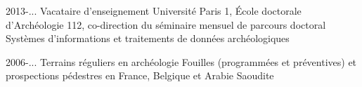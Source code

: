 \begin{cvskills}
  \cvskill
    {2013-...} %
    {Vacataire d'enseignement} %
    {Université Paris 1, École doctorale d'Archéologie 112, co-direction du séminaire mensuel de parcours doctoral Systèmes d'informations et traitements de données archéologiques} %

  \cvskill
    {2006-...} %
    {Terrains réguliers en archéologie} %
    {Fouilles (programmées et préventives) et prospections pédestres en France, Belgique et Arabie Saoudite} %
\end{cvskills}


